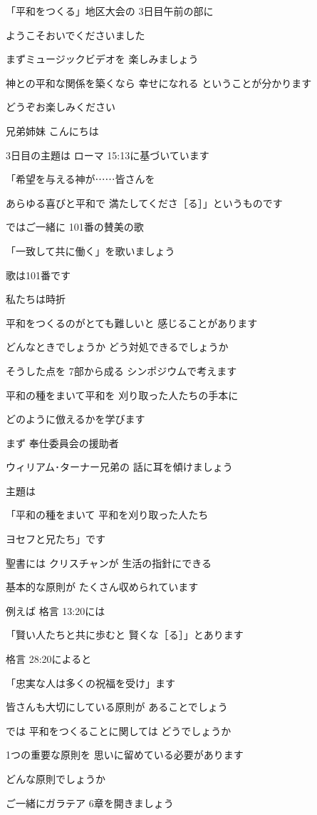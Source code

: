 \documentclass[twocolumn]{jsarticle}
\begin{document}
「平和をつくる」地区大会の
3日目午前の部に

ようこそおいでくださいました

まずミュージックビデオを
楽しみましょう

神との平和な関係を築くなら
幸せになれる ということが分かります

どうぞお楽しみください

兄弟姉妹 こんにちは

3日目の主題は
ローマ 15:13に基づいています

「希望を与える神が⋯⋯皆さんを

あらゆる喜びと平和で
満たしてくださ［る］」というものです

ではご一緒に 101番の賛美の歌

「一致して共に働く」を歌いましょう

歌は101番です

私たちは時折

平和をつくるのがとても難しいと
感じることがあります

どんなときでしょうか
どう対処できるでしょうか

そうした点を 7部から成る
シンポジウムで考えます

平和の種をまいて平和を
刈り取った人たちの手本に

どのように倣えるかを学びます

まず 奉仕委員会の援助者

ウィリアム･ターナー兄弟の
話に耳を傾けましょう

主題は

「平和の種をまいて
平和を刈り取った人たち

ヨセフと兄たち」です

聖書には クリスチャンが
生活の指針にできる

基本的な原則が
たくさん収められています

例えば 格言 13:20には

「賢い人たちと共に歩むと
賢くな［る］」とあります

格言 28:20によると

「忠実な人は多くの祝福を受け」ます

皆さんも大切にしている原則が
あることでしょう

では 平和をつくることに関しては
どうでしょうか

1つの重要な原則を
思いに留めている必要があります

どんな原則でしょうか

ご一緒にガラテア 6章を開きましょう
\end{document}

